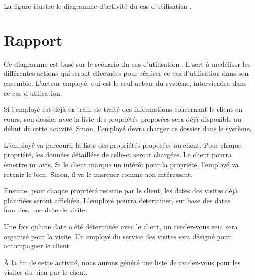 La figure  illustre le diagramme d'activité du cas d'utilisation \selectedusecase{}.

\section{Rapport}

Ce diagramme est basé sur le scénario du cas d'utilisation \selectedusecase{}. Il sert à modéliser les différentes actions qui seront effectuées pour réaliser ce cas d'utilisation dans son ensemble. L'acteur \og{}employé\fg{}, qui est le seul acteur du système, interviendra dans ce cas d'utilisation.

Si l'employé est déjà en train de traité des informations concernant le client en cours, son dossier avec la liste des propriétés proposées sera déjà disponible au début de cette activité. Sinon, l'employé devra charger ce dossier dans le système.

L'employé va parcourir la liste des propriétés proposées au client. Pour chaque propriété, les données détaillées de celle-ci seront chargées. Le client pourra émettre un avis. Si le client marque un intérêt pour la propriété, l'employé va retenir le bien. Sinon, il va le marquer comme non intéressant.

Ensuite, pour chaque propriété retenue par le client, les dates des visites déjà planifiées seront affichées. L'employé pourra déterminer, sur base des dates fournies, une date de visite.

Une fois qu'une date a été déterminée avec le client, un rendez-vous sera sera organisé pour la visite. Un employé du service des visites sera désigné pour accompagner le client.

À la fin de cette activité, nous aurons généré une liste de rendez-vous pour les visites du bien par le client.